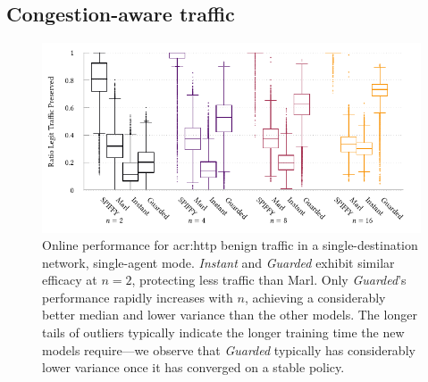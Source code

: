 \subsection{Congestion-aware traffic}
%	
\begin{figure}
	\centering
	\includegraphics[width=\linewidth]{plots/marl/tnsm-tcp-box-single-thesis}
	\caption[Online performance for HTTP benign traffic in a single-destination network, single-agent mode.]{
		Online performance for \gls{acr:http} benign traffic in a single-destination network, single-agent mode.
		\emph{Instant} and \emph{Guarded} exhibit similar efficacy at $n=2$, protecting less traffic than Marl.
		Only \emph{Guarded}'s performance rapidly increases with $n$, achieving a considerably better median and lower variance than the other models.
		The longer tails of outliers typically indicate the longer training time the new models require---we observe that \emph{Guarded} typically has considerably lower variance once it has converged on a stable policy.
		\label{fig:tcp-tree-box}
	}
\end{figure}
%	
